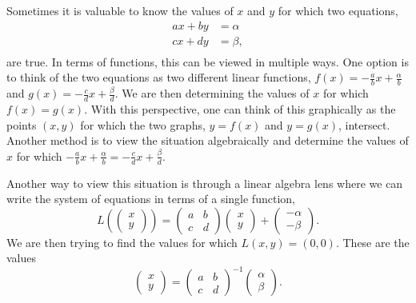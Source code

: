 \documentclass[
]{book}
\theoremstyle{definition}
\theoremstyle{definition}
\theoremstyle{definition}
\theoremstyle{remark}
\begin{document}
Sometimes it is valuable to know the values of \(x\) and \(y\) for which two equations,
\begin{align*}
    ax+by &= \alpha \\
    c x + d y &= \beta, \\
\end{align*}
are true. In terms of functions, this can be viewed in multiple ways. One option is to think of the two equations as two different linear functions, \(f(x)=-\frac{a}{b} x + \frac{\alpha}{b}\) and \(g(x) = -\frac{c}{d} x + \frac{\beta}{d}\). We are then determining the values of \(x\) for which \(f(x)=g(x)\). With this perspective, one can think of this graphically as the points \((x,y)\) for which the two graphs, \(y=f(x)\) and \(y=g(x)\), intersect. Another method is to view the situation algebraically and determine the values of \(x\) for which \(-\frac{a}{b} x + \frac{\alpha}{b}=-\frac{c}{d} x + \frac{\beta}{d}\).

Another way to view this situation is through a linear algebra lens where we can write the system of equations in terms of a single function,
\[L\left( \begin{pmatrix} x \\ y \end{pmatrix} \right) = \begin{pmatrix} a & b \\ c & d \end{pmatrix} \begin{pmatrix} x \\ y \end{pmatrix} + \begin{pmatrix} -\alpha \\ - \beta \end{pmatrix}.\] We are then trying to find the values for which \(L(x,y) = (0,0)\). These are the values
\[\begin{pmatrix} x \\ y \end{pmatrix}= \begin{pmatrix} a & b \\ c & d \end{pmatrix}^{-1} \begin{pmatrix} \alpha \\ \beta \end{pmatrix}.\]
\end{document}
